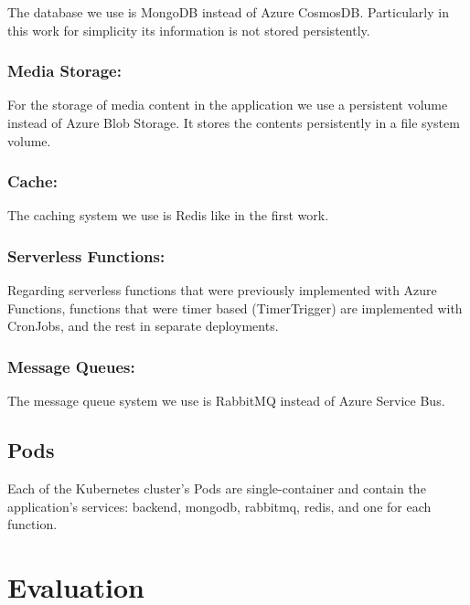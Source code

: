 \documentclass[runningheads]{llncs}
\begin{document}
The database we use is MongoDB instead of Azure CosmosDB. Particularly in this work for simplicity its information is not stored persistently.

\subsubsection{Media Storage:}

For the storage of media content in the application we use a persistent volume instead of Azure Blob Storage. It stores the contents persistently in a file system volume.

\subsubsection{Cache:}

The caching system we use is Redis like in the first work.

\subsubsection{Serverless Functions:}

Regarding serverless functions that were previously implemented with Azure Functions, functions that were timer based (TimerTrigger) are implemented with CronJobs, and the rest in separate deployments.

\subsubsection{Message Queues:}

The message queue system we use is RabbitMQ instead of Azure Service Bus.

\subsection{Pods}

Each of the Kubernetes cluster's Pods are single-container and contain the application's services: backend, mongodb, rabbitmq, redis, and one for each function.

\section{Evaluation}
\end{document}
